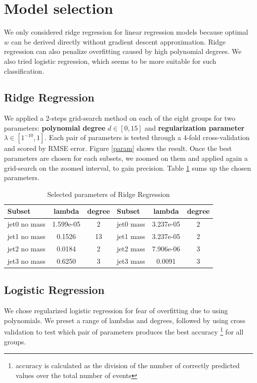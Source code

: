 \documentclass[10pt,conference,compsocconf]{IEEEtran}
\begin{document}
\section{Model selection}
We only considered ridge regression for linear regression models because optimal $w$ can be derived directly without gradient descent approximation. Ridge regression can also penalize overfitting caused by high polynomial degrees. We also tried logistic regression, which seems to be more suitable for such classification.

\subsection{Ridge Regression}
We applied a 2-steps grid-search method on each of the eight groups for two parameters: \textbf{polynomial degree} $d \in [0, 15]$ and \textbf{regularization parameter} $\lambda \in [1^{-10}, 1]$.  Each pair of parameters is tested through a 4-fold cross-validation and scored by RMSE error. Figure \ref{param} shows the result. {\color{red}Once the best parameters are chosen for each subsets, we zoomed on them and applied again a grid-search on the zoomed interval, to gain precision}. Table \ref{tab:param} sums up the chosen parameters.

\begin{table}[htbp]
  \centering
  \begin{tabular}[c]{| l | c | c | l | c | c |}
    \hline
    Subset 	     & lambda & degree & Subset     & lambda      & degree \\
    \hline 
    jet0 no mass & 1.599e-05	& 2	 & jet0 mass  & 3.237e-05  & 2	\\
    jet1 no mass & 0.1526		  & 13 & jet1 mass  & 3.237e-05  & 2 	\\
    jet2 no mass & 0.0184		  & 2	 & jet2 mass  & 7.906e-06  & 3 	\\
    jet3 no mass & 0.6250		  & 3	 & jet3 mass  & 0.0091     & 3  \\
    \hline
  \end{tabular}
  \caption{Selected parameters of Ridge Regression}
  \label{tab:param}
\end{table}


\subsection{Logistic Regression}
We chose regularized logistic regression for fear of overfitting due to using polynomials. We preset a range of lambdas and degrees, followed by using cross validation to test which pair of parameters produces the best accuracy \footnote{accuracy is calculated as the division of the number of correctly predicted values over the total number of events} for all groups. 
\end{document}
